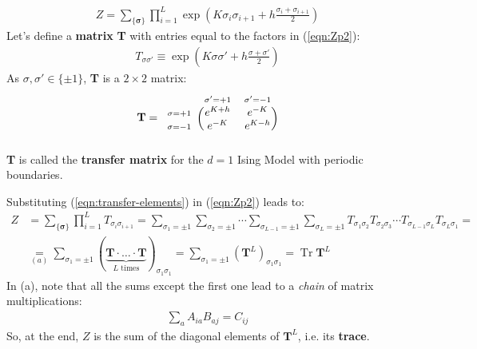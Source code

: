 \documentclass[../template.tex]{subfiles}
\begin{document}
\begin{align} \label{eqn:Zp2}
    Z = \sum_{\{\bm{\sigma}\}} \prod_{i=1}^L \exp\left(K \sigma_i \sigma_{i+1} + h \frac{\sigma_i + \sigma_{i+1}}{2} \right)
\end{align}
Let's define a \textbf{matrix} \textbf{T}  with entries equal to the factors in (\ref{eqn:Zp2}):
\begin{align}\label{eqn:transfer-elements}
    T_{\sigma \sigma'} \equiv \exp\left(K \sigma \sigma' + h \frac{\sigma + \sigma'}{2} \right)
\end{align}
As $\sigma,\sigma' \in \{\pm 1\}$, \textbf{T} is a $2 \times 2$ matrix:
\begin{align*}
    \textbf{T}  = \begin{blockarray}{l*{2}{c}}
        \begin{block}{l*{2}{>{\scriptstyle}c<{}}}
            & \sigma'=+1 & \sigma'=-1 \\
        \end{block}
        \begin{block}{>{\scriptstyle}r<{}(*{2}{c})}
            \sigma=+1 & e^{K+h} & e^{-K} \\
            \sigma=-1 & e^{-K}   & e^{K-h}\\
        \end{block}
    \end{blockarray}
\end{align*}
\textbf{T} is called the \textbf{transfer matrix} for the $d=1$ Ising Model with periodic boundaries. 

Substituting (\ref{eqn:transfer-elements}) in (\ref{eqn:Zp2}) leads to:
\begin{align*}
    Z &= \sum_{\{\bm{\sigma}\}} \prod_{i=1}^L T_{\sigma_i \sigma_{i+1}} = \sum_{\sigma_1 = \pm 1} \sum_{\sigma_2 = \pm 1} \cdots \sum_{\sigma_{L-1} = \pm 1} \sum_{\sigma_L = \pm 1} T_{\sigma_1 \sigma_2} T_{\sigma_2 \sigma_3} \cdots T_{\sigma_{L-1} \sigma_{L}} T_{\sigma_L \sigma_1} =\\
    &\underset{(a)}{=} 
    \sum_{\sigma_1 = \pm 1} (\underbrace{\textbf{T} \cdot \dots \cdot \textbf{T}}_{L \text{ times}})_{\sigma_1 \sigma_1} =
    \sum_{\sigma_1 = \pm 1} (\textbf{T}^L)_{\sigma_1 \sigma_1} = \operatorname{Tr} \textbf{T}^L 
\end{align*}
In (a), note that all the sums except the first one lead to a \textit{chain} of matrix multiplications:
\begin{align*}
    \sum_a A_{ia} B_{aj} = C_{ij}
\end{align*} 
So, at the end, $Z$ is the sum of the diagonal elements of $\textbf{T}^L$, i.e. its \textbf{trace}.
\end{document}
